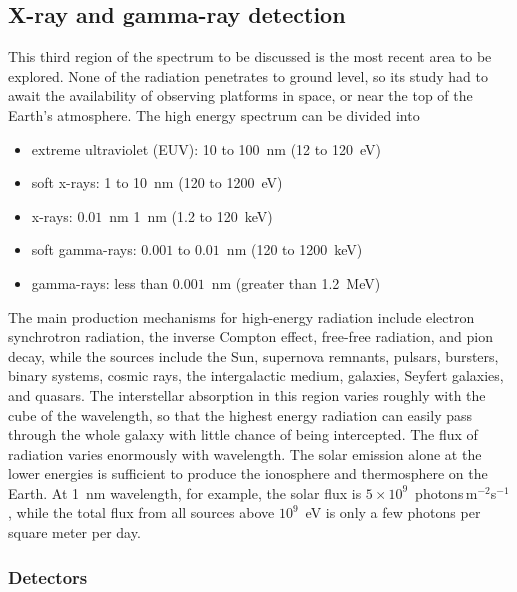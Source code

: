 \documentclass{article}
\begin{document}
\subsection{X-ray and gamma-ray detection}

This third region of the spectrum to be discussed is the most recent area
to be explored. None of the radiation penetrates to ground level, so its
study had to await the availability of observing platforms in space, or near
the top of the Earth's atmosphere. The high energy spectrum can be divided into
\begin{itemize}
\item extreme ultraviolet (EUV): 10 to 100~nm (12 to 120~eV)
\item soft x-rays: 1 to 10~nm (120 to 1200~eV)
\item x-rays: $0.01$~nm 1~nm (1.2 to 120~keV)
\item soft gamma-rays: $0.001$ to $0.01$~nm (120 to 1200~keV)
\item gamma-rays: less than $0.001$~nm (greater than 1.2~MeV)
\end{itemize}

The main production mechanisms for high-energy radiation include electron
synchrotron radiation, the inverse Compton effect, free-free radiation, 
and pion decay, while the sources include the Sun, supernova remnants, pulsars,
bursters, binary systems, cosmic rays, the intergalactic medium, galaxies,
Seyfert galaxies, and quasars. The interstellar absorption in this region
varies roughly with the cube of the wavelength, so that the highest 
energy radiation can easily pass through the whole galaxy with little 
chance of being intercepted. The flux of radiation varies enormously
with wavelength. The solar emission alone at the lower energies is 
sufficient to produce the ionosphere and thermosphere on the Earth. At 
1~nm wavelength, for example, the solar flux is 
$5\times 10^9$~photons$\,$m$^{-2}$s$^{-1}$, while the total flux from all sources
above $10^9$~eV is only a few photons per square meter per day.

\subsubsection{Detectors}
\end{document}
